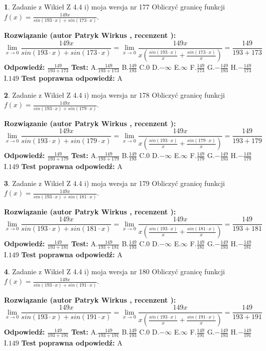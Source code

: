 \documentclass[12pt, a4paper]{article}
\theoremstyle{definition} %
\newtheorem{zad}{}
\newcommand{\zadStart}[1]{\begin{zad}#1\newline}
\newcommand{\zadStop}{\end{zad}}
\newcommand{\rozwStart}[2]{\noindent \textbf{Rozwiązanie (autor #1 , recenzent #2): }\newline}
\newcommand{\rozwStop}{\newline}
\newcommand{\odpStart}{\noindent \textbf{Odpowiedź:}\newline}
\newcommand{\odpStop}{\newline}
\newcommand{\testStart}{\noindent \textbf{Test:}\newline}
\newcommand{\testStop}{\newline}
\newcommand{\kluczStart}{\noindent \textbf{Test poprawna odpowiedź:}\newline}
\newcommand{\kluczStop}{\newline}
\begin{document}
\zadStart{Zadanie z Wikieł Z 4.4 i) moja wersja nr 177}
Obliczyć granicę funkcji $f(x)=\frac{149x}{sin(193\cdot x) +sin(173\cdot x)}$.
\zadStop
\rozwStart{Patryk Wirkus}{}
$$\lim\limits_{x\to 0}\frac{149x}{sin(193\cdot x) +sin(173\cdot x)}=\lim\limits_{x\to 0}\frac{149x}{x(\frac{sin(193\cdot x)}{x}+\frac{sin(173\cdot x)}{x})}=\frac{149}{193+173}$$
\rozwStop
\odpStart
$\frac{149}{193+173}$
\odpStop
\testStart
A.$\frac{149}{193+173}$
B.$\frac{149}{193}$
C.$0$
D.$-\infty$
E.$\infty$
F.$\frac{149}{173}$
G.$-\frac{149}{193}$
H.$-\frac{149}{173}$
I.$149$
\testStop
\kluczStart
A
\kluczStop



\zadStart{Zadanie z Wikieł Z 4.4 i) moja wersja nr 178}
Obliczyć granicę funkcji $f(x)=\frac{149x}{sin(193\cdot x) +sin(179\cdot x)}$.
\zadStop
\rozwStart{Patryk Wirkus}{}
$$\lim\limits_{x\to 0}\frac{149x}{sin(193\cdot x) +sin(179\cdot x)}=\lim\limits_{x\to 0}\frac{149x}{x(\frac{sin(193\cdot x)}{x}+\frac{sin(179\cdot x)}{x})}=\frac{149}{193+179}$$
\rozwStop
\odpStart
$\frac{149}{193+179}$
\odpStop
\testStart
A.$\frac{149}{193+179}$
B.$\frac{149}{193}$
C.$0$
D.$-\infty$
E.$\infty$
F.$\frac{149}{179}$
G.$-\frac{149}{193}$
H.$-\frac{149}{179}$
I.$149$
\testStop
\kluczStart
A
\kluczStop



\zadStart{Zadanie z Wikieł Z 4.4 i) moja wersja nr 179}
Obliczyć granicę funkcji $f(x)=\frac{149x}{sin(193\cdot x) +sin(181\cdot x)}$.
\zadStop
\rozwStart{Patryk Wirkus}{}
$$\lim\limits_{x\to 0}\frac{149x}{sin(193\cdot x) +sin(181\cdot x)}=\lim\limits_{x\to 0}\frac{149x}{x(\frac{sin(193\cdot x)}{x}+\frac{sin(181\cdot x)}{x})}=\frac{149}{193+181}$$
\rozwStop
\odpStart
$\frac{149}{193+181}$
\odpStop
\testStart
A.$\frac{149}{193+181}$
B.$\frac{149}{193}$
C.$0$
D.$-\infty$
E.$\infty$
F.$\frac{149}{181}$
G.$-\frac{149}{193}$
H.$-\frac{149}{181}$
I.$149$
\testStop
\kluczStart
A
\kluczStop



\zadStart{Zadanie z Wikieł Z 4.4 i) moja wersja nr 180}
Obliczyć granicę funkcji $f(x)=\frac{149x}{sin(193\cdot x) +sin(191\cdot x)}$.
\zadStop
\rozwStart{Patryk Wirkus}{}
$$\lim\limits_{x\to 0}\frac{149x}{sin(193\cdot x) +sin(191\cdot x)}=\lim\limits_{x\to 0}\frac{149x}{x(\frac{sin(193\cdot x)}{x}+\frac{sin(191\cdot x)}{x})}=\frac{149}{193+191}$$
\rozwStop
\odpStart
$\frac{149}{193+191}$
\odpStop
\testStart
A.$\frac{149}{193+191}$
B.$\frac{149}{193}$
C.$0$
D.$-\infty$
E.$\infty$
F.$\frac{149}{191}$
G.$-\frac{149}{193}$
H.$-\frac{149}{191}$
I.$149$
\testStop
\kluczStart
A
\kluczStop
\end{document}
